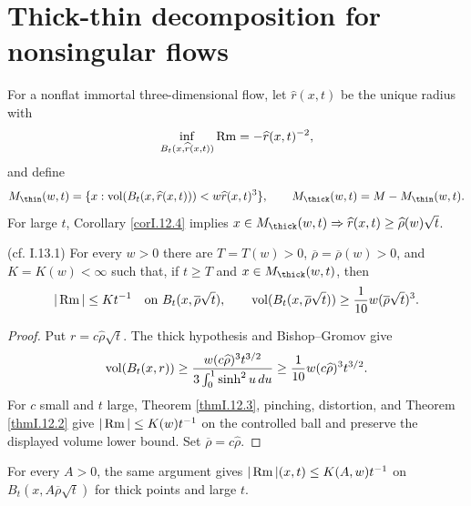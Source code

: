 \section{Thick-thin decomposition for nonsingular flows} \label{I.13.1}
For a nonflat immortal three-dimensional flow, let $\widehat r(x,t)$ be the
unique radius with
\[
\inf_{B_t(x,\widehat r(x,t))}\operatorname{Rm}=-\widehat r(x,t)^{-2},
\]
and define
\begin{equation}\label{thinpart}
M_{\thin}(w,t)=\{x:\vol(B_t(x,\widehat r(x,t)))<
w\widehat r(x,t)^3\},\qquad M_{\thick}(w,t)=M-M_{\thin}(w,t).
\end{equation}
For large $t$, Corollary \ref{corI.12.4} implies
$x\in M_{\thick}(w,t)\Rightarrow\widehat r(x,t)\geq\widehat\rho(w)\sqrt t$.
\begin{theorem}
\label{thm:kl-thick-thin-decomposition-nonsingular-flows-existence-thick-thin-geometry}

(cf. I.13.1) \label{thmI.13.1}
For every $w>0$ there are $T=T(w)>0$, $\overline\rho=\overline\rho(w)>0$,
and $K=K(w)<\infty$ such that, if $t\geq T$ and
$x\in M_{\thick}(w,t)$, then
\[
|\operatorname{Rm}|\leq Kt^{-1}\quad\hbox{on }B_t(x,\overline\rho\sqrt t),
\qquad
\operatorname{vol}(B_t(x,\overline\rho\sqrt t))
\geq\frac1{10}w(\overline\rho\sqrt t)^3.
\]
\end{theorem}
\begin{proof}
\sketch Put $r=c\widehat\rho\sqrt t$.  The thick hypothesis and
Bishop--Gromov give
\[
\operatorname{vol}(B_t(x,r))\geq
\frac{w(c\widehat\rho)^3t^{3/2}}{3\int_0^1\sinh^2u\,du}
\geq\frac1{10}w(c\widehat\rho)^3t^{3/2}.
\]
For $c$ small and $t$ large, Theorem \ref{thmI.12.3}, pinching, distortion,
and Theorem \ref{thmI.12.2} give $|\operatorname{Rm}|\leq K(w)t^{-1}$ on the controlled
ball and preserve the displayed volume lower bound.  Set
$\overline\rho=c\widehat\rho$.
\end{proof}
\begin{remark}
\label{rem:kl-thick-thin-decomposition-nonsingular-flows-estimates-thick-thin-geometry}


For every $A>0$, the same argument gives
$|\operatorname{Rm}|(x,t)\leq K(A,w)t^{-1}$ on
$B_t(x,A\overline\rho\sqrt t)$ for thick points and large $t$.
\end{remark}
